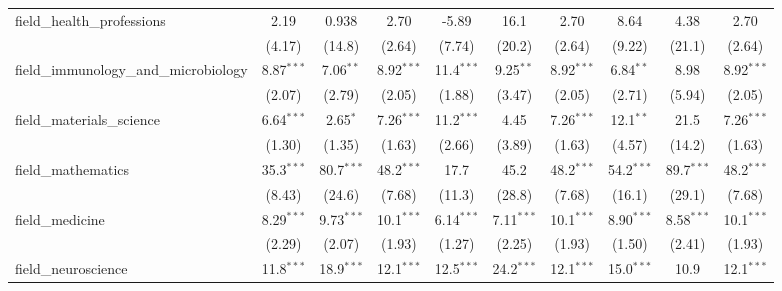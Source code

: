 \begin{tabular}{lccccccccc}
   field\_health\_professions                                  & 2.19          & 0.938         & 2.70          & -5.89        & 16.1          & 2.70          & 8.64          & 4.38           & 2.70\\   
                                                               & (4.17)        & (14.8)        & (2.64)        & (7.74)       & (20.2)        & (2.64)        & (9.22)        & (21.1)         & (2.64)\\   
   field\_immunology\_and\_microbiology                        & 8.87$^{***}$  & 7.06$^{**}$   & 8.92$^{***}$  & 11.4$^{***}$ & 9.25$^{**}$   & 8.92$^{***}$  & 6.84$^{**}$   & 8.98           & 8.92$^{***}$\\   
                                                               & (2.07)        & (2.79)        & (2.05)        & (1.88)       & (3.47)        & (2.05)        & (2.71)        & (5.94)         & (2.05)\\   
   field\_materials\_science                                   & 6.64$^{***}$  & 2.65$^{*}$    & 7.26$^{***}$  & 11.2$^{***}$ & 4.45          & 7.26$^{***}$  & 12.1$^{**}$   & 21.5           & 7.26$^{***}$\\   
                                                               & (1.30)        & (1.35)        & (1.63)        & (2.66)       & (3.89)        & (1.63)        & (4.57)        & (14.2)         & (1.63)\\   
   field\_mathematics                                          & 35.3$^{***}$  & 80.7$^{***}$  & 48.2$^{***}$  & 17.7         & 45.2          & 48.2$^{***}$  & 54.2$^{***}$  & 89.7$^{***}$   & 48.2$^{***}$\\   
                                                               & (8.43)        & (24.6)        & (7.68)        & (11.3)       & (28.8)        & (7.68)        & (16.1)        & (29.1)         & (7.68)\\   
   field\_medicine                                             & 8.29$^{***}$  & 9.73$^{***}$  & 10.1$^{***}$  & 6.14$^{***}$ & 7.11$^{***}$  & 10.1$^{***}$  & 8.90$^{***}$  & 8.58$^{***}$   & 10.1$^{***}$\\   
                                                               & (2.29)        & (2.07)        & (1.93)        & (1.27)       & (2.25)        & (1.93)        & (1.50)        & (2.41)         & (1.93)\\   
   field\_neuroscience                                         & 11.8$^{***}$  & 18.9$^{***}$  & 12.1$^{***}$  & 12.5$^{***}$ & 24.2$^{***}$  & 12.1$^{***}$  & 15.0$^{***}$  & 10.9           & 12.1$^{***}$\\   

\end{tabular}
